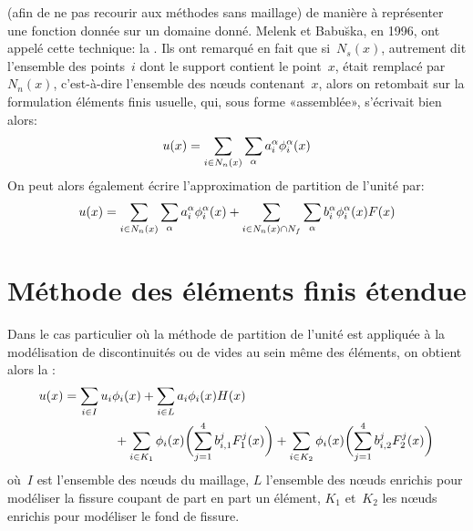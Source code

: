  (afin de ne pas recourir aux méthodes sans maillage) de manière à représenter une fonction donnée sur un domaine donné. Melenk et Babu\u{s}ka, en 1996, ont appelé cette technique: la .
Ils ont remarqué en fait que si~$N_s(x)$, autrement dit l'ensemble des points~$i$ dont le support contient le point~$x$, était remplacé par~$N_n(x)$, c'est-à-dire l'ensemble des nœuds contenant~$x$, alors on retombait sur la formulation éléments finis usuelle, qui, sous forme «assemblée», s'écrivait bien alors:
\begin{equation}
u(x) = \displaystyle\sum_{i\in N_n(x)}\displaystyle\sum_{\alpha} a_i^\alpha \phi_i^\alpha(x)
\end{equation}
 On peut alors également écrire l'approximation de partition de l'unité par:
\begin{equation}
u(x) = \displaystyle\sum_{i\in N_n(x)}\displaystyle\sum_{\alpha} a_i^\alpha \phi_i^\alpha(x) + \displaystyle\sum_{i\in N_n(x)\cap N_f}\displaystyle\sum_{\alpha} b_i^\alpha\phi_i^\alpha(x)F(x)
\end{equation}


\medskip
\section{Méthode des éléments finis étendue}\label{Sec-XFEM}

Dans le cas particulier où la méthode de partition de l'unité est appliquée à la modélisation de discontinuités ou de vides au sein même des éléments, on obtient alors la :
\begin{equation}
\begin{aligned}
u(x) &= \displaystyle\sum_{i\in I}u_i\phi_i(x) + \displaystyle\sum_{i\in L} a_i\phi_i(x) H(x)\\
&\qquad\qquad + \displaystyle\sum_{i\in K_1}\phi_i(x)\biggl(\displaystyle\sum_{j=1}^4b_{i,1}^jF_1^j(x)\biggr) + \displaystyle\sum_{i\in K_2}\phi_i(x)\biggl(\displaystyle\sum_{j=1}^4b_{i,2}^jF_2^j(x)\biggr)
\end{aligned}
\end{equation}
où~$I$ est l'ensemble des nœuds du maillage, $L$ l'ensemble des nœuds enrichis pour modéliser la fissure coupant de part en part un élément, $K_1$ et~$K_2$ les nœuds enrichis pour modéliser le fond de fissure.

